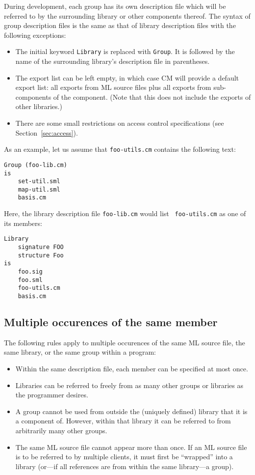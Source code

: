 \documentclass{article}
\begin{document}
During development, each group has its own description file which will
be referred to by the surrounding library or other components thereof.
The syntax of group description files is the same as that of library
description files with the following exceptions:

\begin{itemize}
\item The initial keyword {\tt Library} is replaced with {\tt Group}.
It is followed by the name of the surrounding library's description
file in parentheses.
\item The export list can be left empty, in which case CM will
provide a default export list: all exports from ML source files plus
all exports from sub-components of the component.  (Note that this does
not include the exports of other libraries.)
\item There are some small restrictions on access control
specifications (see Section~\ref{sec:access}).
\end{itemize}

As an example, let us assume that {\tt foo-utils.cm} contains the
following text:

\begin{verbatim}
Group (foo-lib.cm)
is
    set-util.sml
    map-util.sml
    basis.cm
\end{verbatim}

Here, the library description file {\tt foo-lib.cm} would list {\tt
foo-utils.cm} as one of its members:

\begin{verbatim}
Library
    signature FOO
    structure Foo
is
    foo.sig
    foo.sml
    foo-utils.cm
    basis.cm
\end{verbatim}

\subsection{Multiple occurences of the same member}
\label{sec:multioccur}

The following rules apply to multiple occurences of the same ML source
file, the same library, or the same group within a program:

\begin{itemize}
\item Within the same description file, each member can be specified
at most once.
\item Libraries can be referred to freely from as many other groups or
libraries as the programmer desires.
\item A group cannot be used from outside the (uniquely defined)
library that it is a component of.  However, within that library it
can be referred to from arbitrarily many other groups.
\item The same ML source file cannot appear more than once.  If an ML
source file is to be referred to by multiple clients, it must first be
``wrapped'' into a library (or---if all references are from within the
same library---a group).
\end{itemize}
\end{document}
